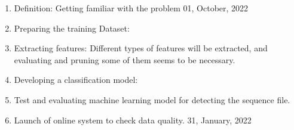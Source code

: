 \documentclass[a4paper]{article}
\newcommand{\deadline}[1]{{\color{blue} \hfill{#1} }}
\begin{document}
    \begin{enumerate}
        \item Definition: Getting familiar with the problem \deadline{01, October, 2022}
        \item Preparing the training Dataset:
        \item Extracting features: Different types of features will be extracted, and evaluating and pruning some of them seems to be necessary.
        \item Developing a classification model: 
        \item Test and evaluating machine learning model for detecting the sequence file.
        \item Launch of online system to check data quality. \deadline{31, January, 2022}
    \end{enumerate}
\end{document}
